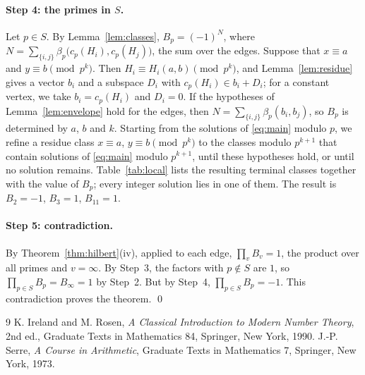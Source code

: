 \documentclass[11pt]{article}
\begin{document}
\paragraph{Step 4: the primes in $S$.} Let $p\in S$. By Lemma~\ref{lem:classes}, $B_p=(-1)^{N}$, where $N=\sum_{\{i,j\}}\beta_p\bigl(c_p(H_i),c_p(H_j)\bigr)$, the sum over the edges. Suppose that $x\equiv a$ and $y\equiv b\pmod{p^k}$. Then $H_i\equiv H_i(a,b)\pmod{p^k}$, and Lemma~\ref{lem:residue} gives a vector $b_i$ and a subspace $D_i$ with $c_p(H_i)\in b_i+D_i$; for a constant vertex, we take $b_i=c_p(H_i)$ and $D_i=0$. If the hypotheses of Lemma~\ref{lem:envelope} hold for the edges, then $N=\sum_{\{i,j\}}\beta_p(b_i,b_j)$, so $B_p$ is determined by $a$, $b$ and $k$. Starting from the solutions of \eqref{eq:main} modulo $p$, we refine a residue class $x\equiv a$, $y\equiv b\pmod{p^k}$ to the classes modulo $p^{k+1}$ that contain solutions of \eqref{eq:main} modulo $p^{k+1}$, until these hypotheses hold, or until no solution remains. Table~\ref{tab:local} lists the resulting terminal classes together with the value of $B_p$; every integer solution lies in one of them. The result is $B_{2}=-1$, $B_{3}=1$, $B_{11}=1$.

\paragraph{Step 5: contradiction.} By Theorem~\ref{thm:hilbert}(iv), applied to each edge, $\prod_vB_v=1$, the product over all primes and $v=\infty$. By Step~3, the factors with $p\notin S$ are $1$, so $\prod_{p\in S}B_p=B_\infty=1$ by Step~2. But by Step~4, $\prod_{p\in S}B_p=-1$. This contradiction proves the theorem.
\qed

\begin{thebibliography}{9}
 K. Ireland and M. Rosen, \emph{A Classical Introduction to Modern Number Theory}, 2nd ed., Graduate Texts in Mathematics 84, Springer, New York, 1990.
 J.-P. Serre, \emph{A Course in Arithmetic}, Graduate Texts in Mathematics 7, Springer, New York, 1973.
\end{thebibliography}
\end{document}
